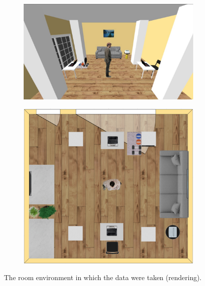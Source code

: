 \documentclass[binding=0.7cm, oneside]{sapthesis}
\begin{document}
\begin{figure}[t]
    \centering
    \begin{subfigure}{0.50\textwidth}
        \includegraphics[width=\textwidth]{images/3D_room.jpg}
        \label{fig:3D_room}
    \end{subfigure}
    \quad
    \begin{subfigure}{0.40\textwidth}
        \includegraphics[width=\textwidth]{images/room2.png}
        \label{fig:2D_room}
    \end{subfigure}
    \caption{The room environment in which the data were taken (rendering).}
    \label{fig:room}
\end{figure}
\end{document}
